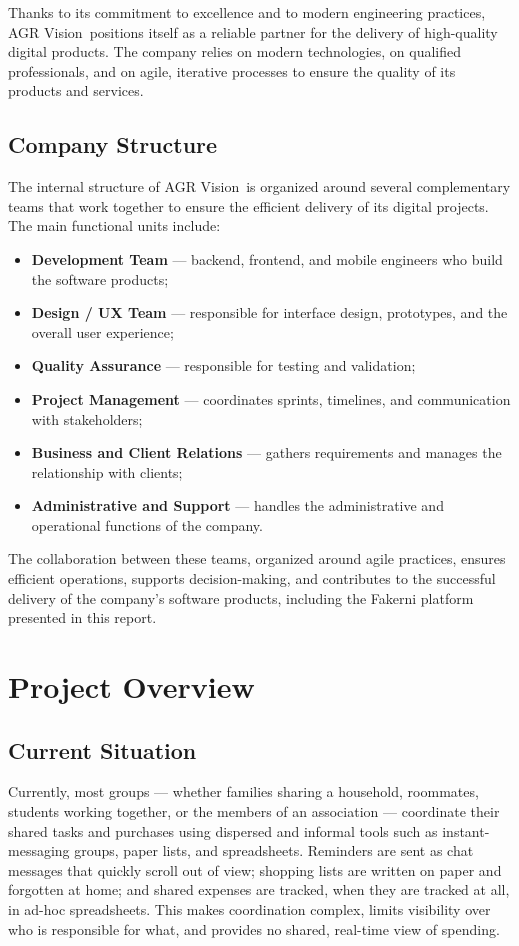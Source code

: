 \documentclass[12pt,a4paper,oneside]{report}
\newcommand{\myCompany}{AGR Vision}
\begin{document}
Thanks to its commitment to excellence and to modern engineering practices,
\myCompany\ positions itself as a reliable partner for the delivery of
high-quality digital products. The company relies on modern technologies, on
qualified professionals, and on agile, iterative processes to ensure the quality
of its products and services.

\subsection{Company Structure}
The internal structure of \myCompany\ is organized around several complementary
teams that work together to ensure the efficient delivery of its digital projects.
The main functional units include:
\begin{itemize}[nosep]
  \item \textbf{Development Team} --- backend, frontend, and mobile engineers who
        build the software products;
  \item \textbf{Design / UX Team} --- responsible for interface design, prototypes,
        and the overall user experience;
  \item \textbf{Quality Assurance} --- responsible for testing and validation;
  \item \textbf{Project Management} --- coordinates sprints, timelines, and
        communication with stakeholders;
  \item \textbf{Business and Client Relations} --- gathers requirements and manages
        the relationship with clients;
  \item \textbf{Administrative and Support} --- handles the administrative and
        operational functions of the company.
\end{itemize}
The collaboration between these teams, organized around agile practices, ensures
efficient operations, supports decision-making, and contributes to the successful
delivery of the company's software products, including the Fakerni platform
presented in this report.

\section{Project Overview}
\subsection{Current Situation}
Currently, most groups --- whether families sharing a household, roommates,
students working together, or the members of an association --- coordinate their
shared tasks and purchases using dispersed and informal tools such as
instant-messaging groups, paper lists, and spreadsheets. Reminders are sent as
chat messages that quickly scroll out of view; shopping lists are written on paper
and forgotten at home; and shared expenses are tracked, when they are tracked at
all, in ad-hoc spreadsheets. This makes coordination complex, limits visibility
over who is responsible for what, and provides no shared, real-time view of
spending.
\end{document}
